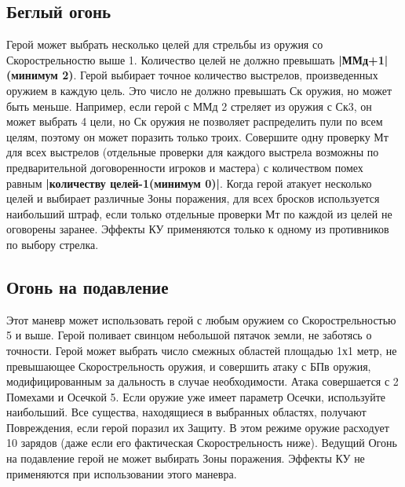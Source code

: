 \subsection{Беглый огонь}
Герой может выбрать несколько целей для стрельбы из оружия со Скорострельностю выше 1. Количество целей не должно превышать \textbf{|ММд+1|(минимум 2)}. Герой выбирает точное количество выстрелов, произведенных оружием в каждую цель. Это число не должно превышать Ск оружия, но может быть меньше. Например, если герой с ММд 2 стреляет из оружия с Ск3, он может выбрать 4 цели, но Ск оружия не позволяет распределить пули по всем целям, поэтому он может поразить только троих.
\newline
Совершите одну проверку Мт для всех выстрелов (отдельные проверки для каждого выстрела возможны по предварительной договоренности игроков и мастера) с количеством помех равным \textbf{|количеству целей-1(минимум 0)|}. Когда герой атакует несколько целей и выбирает различные Зоны поражения, для всех бросков используется наибольший штраф, если только отдельные проверки Мт по каждой из целей не оговорены заранее.
\newline
Эффекты КУ применяются только к одному из противников по выбору стрелка.
\subsection{Огонь на подавление}
Этот маневр может использовать герой с любым оружием со Скорострельностью 5 и выше. Герой поливает свинцом небольшой пятачок земли, не заботясь о точности. Герой может выбрать число смежных областей площадью 1х1 метр, не превышающее Скорострельность оружия, и совершить атаку с БПв оружия, модифицированным за дальность в случае необходимости. Атака совершается с 2 Помехами и Осечкой 5. Если оружие уже имеет параметр Осечки, используйте наибольший. Все существа, находящиеся в выбранных областях, получают Повреждения, если герой поразил их Защиту. В этом режиме оружие расходует 10 зарядов (даже если его фактическая Скорострельность ниже). Ведущий Огонь на подавление герой не может выбирать Зоны поражения.
\newline
Эффекты КУ не применяются при использовании этого маневра.